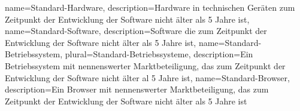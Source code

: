 {
	name=Standard-Hardware,
	description={Hardware in technischen Geräten zum Zeitpunkt der Entwicklung der Software nicht älter als 5 Jahre ist},
}
{
	name=Standard-Software,
	description={Software die zum Zeitpunkt der Entwicklung der Software nicht älter als 5 Jahre ist},
}
{
	name=Standard-Betriebssystem,
	plural=Standard-Betriebssysteme,
	description={Ein Betriebssystem mit nennenswerter Marktbeteiligung, das zum Zeitpunkt der Entwicklung der Software nicht älter al 5 Jahre ist},
}
{
	name=Standard-Browser,
	description={Ein Browser mit nennenswerter Marktbeteiligung, das zum Zeitpunkt der Entwicklung der Software nicht älter als 5 Jahre ist}
}
